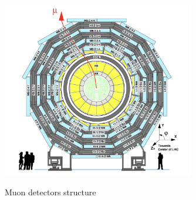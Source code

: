 			\begin{figure}[H]
			\centering{}
		    	\includegraphics[width=0.75\textwidth]{Figures/ExpApparatus/muon_chamber2.png}\\
			\caption{Muon detectors structure\cite{Chatrchyan:2008aa}}
			\label{ExpApp:fig:muon_chamber2}
			\end{figure}
			\FloatBarrier





